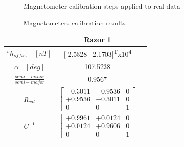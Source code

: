 \begin{figure}[!htp]
	\centering
	\hfill
	\hfill
	\caption{Magnetometer calibration steps applied to real data}
	\label{fig:mag_cal_din0}
\end{figure}


\begin{table}[!hbt]
	\centering
	\begin{tabular}{ccc}
		\toprule
		{} & \textbf{Razor 1} \\
		\midrule
		${}^bh_{offset}\quad[nT]$ &[-2.5828\, -2.1703]\textsuperscript{T}x10\textsuperscript{4} \\
		\addlinespace[5pt]
		$\alpha\quad [deg]$ & 107.5238 \\
		\addlinespace[5pt]
		$\frac{semi-minor}{semi-major}$ & 0.9567\\
		\addlinespace[5pt]
		$R_{cal}$ & $\begin{bmatrix}
		-0.3011 & -0.9536 & 0 \\
		+0.9536 & -0.3011 & 0 \\
		0		 &  0	   & 1 \end{bmatrix}$ \\
		\addlinespace[5pt]
		$C^{-1} $ &$\begin{bmatrix}
		+0.9961& +0.0124 & 0\\
		+0.0124& +0.9606 & 0\\
		0     & 0      & 1
		\end{bmatrix} $		 \\
		\addlinespace[5pt]
		\bottomrule
	\end{tabular}
	\caption{Magnetometers calibration results.}
	\label{tab:mag_cal_results}
\end{table}

